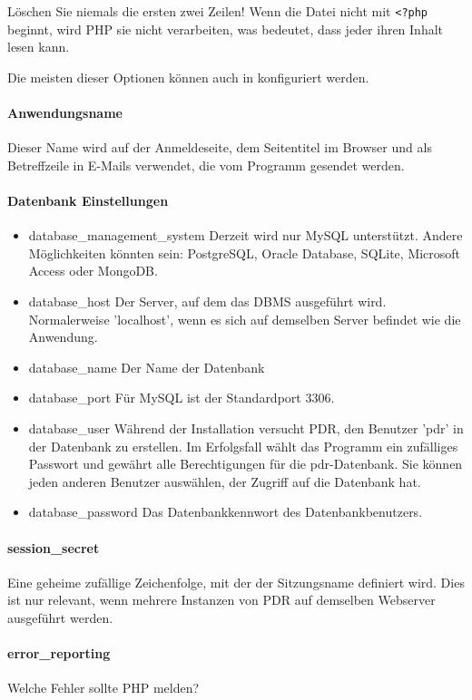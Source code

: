 Löschen Sie niemals die ersten zwei Zeilen! Wenn die Datei nicht mit
\lstinline|<?php| beginnt, wird PHP sie nicht verarbeiten, was bedeutet,
dass jeder ihren Inhalt lesen kann. 


Die meisten dieser Optionen können auch in  konfiguriert werden. 

\paragraph{Anwendungsname} Dieser Name wird auf der Anmeldeseite, dem Seitentitel im Browser und als Betreffzeile in E-Mails verwendet, die vom Programm gesendet werden.

\paragraph{Datenbank Einstellungen}
\begin{itemize}
	\item database\_management\_system  Derzeit wird nur MySQL unterstützt. Andere
Möglichkeiten könnten sein: PostgreSQL, Oracle Database, SQLite, Microsoft
Access oder MongoDB.
	\item database\_host Der Server, auf dem das DBMS ausgeführt wird. Normalerweise
'localhost', wenn es sich auf demselben Server befindet wie die Anwendung.
	\item database\_name Der Name der Datenbank
	\item database\_port Für MySQL ist der Standardport 3306.
	\item database\_user  Während der Installation versucht PDR, den Benutzer 'pdr' in
der Datenbank zu erstellen. Im Erfolgsfall wählt das Programm ein zufälliges
Passwort und gewährt alle Berechtigungen für die pdr-Datenbank. Sie können
jeden anderen Benutzer auswählen, der Zugriff auf die Datenbank hat.
	\item database\_password Das Datenbankkennwort des Datenbankbenutzers.
\end{itemize}

\paragraph{session\_secret}
Eine geheime zufällige Zeichenfolge, mit der der Sitzungsname definiert
wird. Dies ist nur relevant, wenn mehrere Instanzen von PDR auf demselben
Webserver ausgeführt werden. 

\paragraph{error\_reporting} Welche Fehler
sollte PHP melden? 

